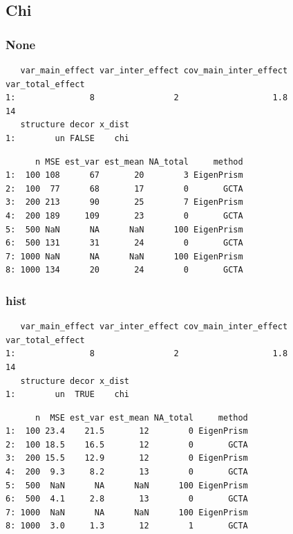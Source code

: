 \documentclass[]{article}
\begin{document}
\subsection{Chi}\label{chi}

\subsubsection{None}\label{none-1}

\begin{verbatim}
   var_main_effect var_inter_effect cov_main_inter_effect var_total_effect
1:               8                2                   1.8               14
   structure decor x_dist
1:        un FALSE    chi
\end{verbatim}

\begin{verbatim}
      n MSE est_var est_mean NA_total     method
1:  100 108      67       20        3 EigenPrism
2:  100  77      68       17        0       GCTA
3:  200 213      90       25        7 EigenPrism
4:  200 189     109       23        0       GCTA
5:  500 NaN      NA      NaN      100 EigenPrism
6:  500 131      31       24        0       GCTA
7: 1000 NaN      NA      NaN      100 EigenPrism
8: 1000 134      20       24        0       GCTA
\end{verbatim}

\subsubsection{hist}\label{hist-1}

\begin{verbatim}
   var_main_effect var_inter_effect cov_main_inter_effect var_total_effect
1:               8                2                   1.8               14
   structure decor x_dist
1:        un  TRUE    chi
\end{verbatim}

\begin{verbatim}
      n  MSE est_var est_mean NA_total     method
1:  100 23.4    21.5       12        0 EigenPrism
2:  100 18.5    16.5       12        0       GCTA
3:  200 15.5    12.9       12        0 EigenPrism
4:  200  9.3     8.2       13        0       GCTA
5:  500  NaN      NA      NaN      100 EigenPrism
6:  500  4.1     2.8       13        0       GCTA
7: 1000  NaN      NA      NaN      100 EigenPrism
8: 1000  3.0     1.3       12        1       GCTA
\end{verbatim}
\end{document}
